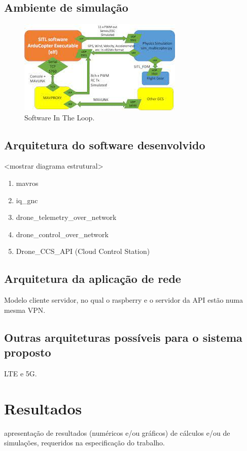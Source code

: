 \documentclass[12pt,a4paper,oneside]{book}
\begin{document}
\section{Ambiente de simulação}
%
\begin{figure}[!htbp]
  \centering
  \includegraphics[width=0.7\textwidth]{Images/Diagramas/sitl.jpeg}
  \caption{Software In The Loop.}
  \label{fig:sitl.jpeg.0}
\end{figure}
%

\section{Arquitetura do software desenvolvido}

<mostrar diagrama estrutural>

\begin{enumerate}
  \item mavros 
  \item iq\_gnc
  \item drone\_telemetry\_over\_network
  \item drone\_control\_over\_network
  \item Drone\_CCS\_API (Cloud Control Station)
\end{enumerate}

\section{Arquitetura da aplicação de rede}

Modelo cliente servidor, no qual o raspberry e o servidor da API estão numa mesma VPN. 

\section{Outras arquiteturas possíveis para o sistema proposto}

LTE e 5G.


\chapter{Resultados}
%
\thispagestyle{empty} 
%
apresentação de resultados (numéricos e/ou gráficos) 
de cálculos e/ou de simulações, requeridos na especificação do trabalho.
\end{document}
